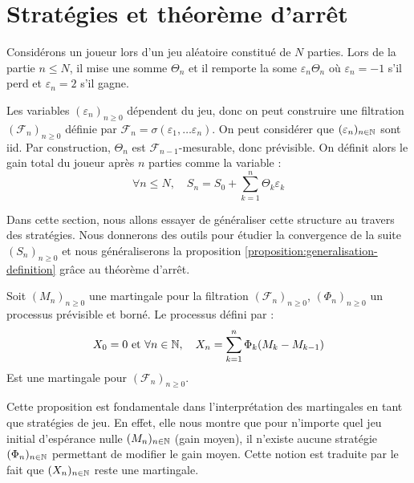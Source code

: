 
\section{Stratégies et théorème d'arrêt}

\begin{example}
    Considérons un joueur lors d'un jeu aléatoire constitué de $N$ parties. Lors de la partie 
    $n \leqslant N$, il mise une somme $ \Theta_n$ et il remporte la some $ \varepsilon_n \Theta_n$ où 
    $ \varepsilon_n = -1$ s'il perd et $ \varepsilon_n = 2$ s'il gagne. 

    \medskip

    Les variables $( \varepsilon_n)_{n \geqslant 0}$ dépendent du jeu, donc on peut construire une filtration 
    $ ( \mathcal{F}_n)_{n \geqslant 0}$ définie par $ \mathcal{F}_n = \sigma( \varepsilon_1, \dots \varepsilon_n)$. 
    On peut considérer que $( \varepsilon_n)_{n \in \mathbb{N}}$ sont iid. Par construction, $\Theta_n$ est $\mathcal{F}_{n-1}$-mesurable, donc prévisible.
    On définit alors le gain total du joueur après $n$ parties comme la variable : 
        $$ \forall n \leqslant N, \quad S_n = S_0 + \sum_{k=1}^{n} \Theta_k \varepsilon_k $$ 
\end{example}

Dans cette section, nous allons essayer de généraliser cette structure au travers des stratégies. 
Nous donnerons des outils pour étudier la convergence de la suite $(S_n)_{n \geqslant 0}$ et nous généraliserons la 
proposition \ref{proposition:generalisation-definition} grâce au théorème d'arrêt.

\begin{proposition}
    Soit $(M_n)_{n \geqslant 0}$ une martingale pour la filtration $( \mathcal{F}_n)_{n \geqslant 0}$, 
    $ ( \Phi_n)_{n \geqslant 0}$ un processus prévisible et borné. Le processus défini par :
        \begin{equation}\label{eq:not-optimal-strategy}
            X_0 = 0 \text{ et } \forall n \in \mathbb{N}, \quad X_n = \sum_{k=1}^{n} \Phi_k (M_k - M_{k-1})
        \end{equation}
    Est une martingale pour $( \mathcal{F}_n)_{n \geqslant 0}$. 
\end{proposition}

Cette proposition est fondamentale dans l'interprétation des martingales en tant que stratégies de jeu. 
En effet, elle nous montre que pour n'importe quel jeu initial d'espérance nulle $(M_n)_{n \in \mathbb{N}}$ (gain moyen), il n'existe 
aucune stratégie $( \Phi_n)_{n \in \mathbb{N}}$ permettant de modifier le gain moyen. 
Cette notion est traduite par le fait que $(X_n)_{n \in \mathbb{N}}$ reste une martingale. 

